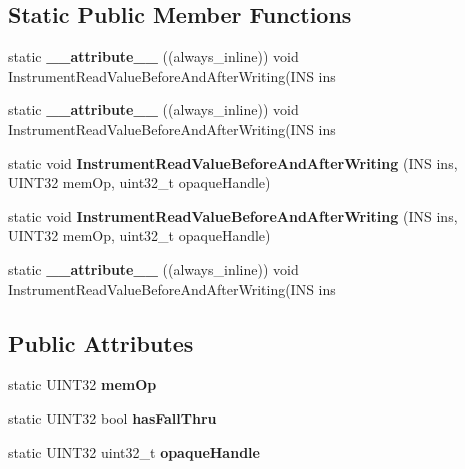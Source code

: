\subsection*{Static Public Member Functions}
\begin{DoxyCompactItemize}
\item 
\hypertarget{structRedSpyInstrument_abc956078efb8739970de8475ac79ddd4}{static {\bfseries \-\_\-\-\_\-attribute\-\_\-\-\_\-} ((always\-\_\-inline)) void Instrument\-Read\-Value\-Before\-And\-After\-Writing(I\-N\-S ins}\label{structRedSpyInstrument_abc956078efb8739970de8475ac79ddd4}

\item 
\hypertarget{structRedSpyInstrument_abc956078efb8739970de8475ac79ddd4}{static {\bfseries \-\_\-\-\_\-attribute\-\_\-\-\_\-} ((always\-\_\-inline)) void Instrument\-Read\-Value\-Before\-And\-After\-Writing(I\-N\-S ins}\label{structRedSpyInstrument_abc956078efb8739970de8475ac79ddd4}

\item 
\hypertarget{structRedSpyInstrument_a5b115f012552be281048f4db0f4e028b}{static void {\bfseries Instrument\-Read\-Value\-Before\-And\-After\-Writing} (I\-N\-S ins, U\-I\-N\-T32 mem\-Op, uint32\-\_\-t opaque\-Handle)}\label{structRedSpyInstrument_a5b115f012552be281048f4db0f4e028b}

\item 
\hypertarget{structRedSpyInstrument_a5b115f012552be281048f4db0f4e028b}{static void {\bfseries Instrument\-Read\-Value\-Before\-And\-After\-Writing} (I\-N\-S ins, U\-I\-N\-T32 mem\-Op, uint32\-\_\-t opaque\-Handle)}\label{structRedSpyInstrument_a5b115f012552be281048f4db0f4e028b}

\item 
\hypertarget{structRedSpyInstrument_abc956078efb8739970de8475ac79ddd4}{static {\bfseries \-\_\-\-\_\-attribute\-\_\-\-\_\-} ((always\-\_\-inline)) void Instrument\-Read\-Value\-Before\-And\-After\-Writing(I\-N\-S ins}\label{structRedSpyInstrument_abc956078efb8739970de8475ac79ddd4}

\end{DoxyCompactItemize}
\subsection*{Public Attributes}
\begin{DoxyCompactItemize}
\item 
\hypertarget{structRedSpyInstrument_a41f9d43d4f21ae9ae2a7827026450fb6}{static U\-I\-N\-T32 {\bfseries mem\-Op}}\label{structRedSpyInstrument_a41f9d43d4f21ae9ae2a7827026450fb6}

\item 
static U\-I\-N\-T32 bool {\bfseries has\-Fall\-Thru}
\item 
static U\-I\-N\-T32 uint32\-\_\-t {\bfseries opaque\-Handle}
\end{DoxyCompactItemize}


